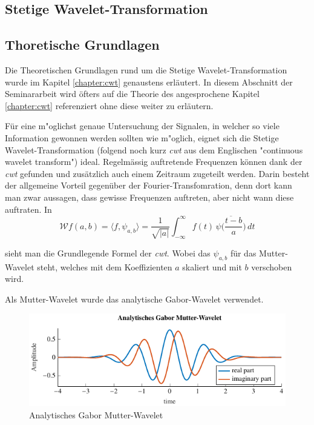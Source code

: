 \begin{refsection}
\newpage
\section{Stetige Wavelet-Transformation}
\subsection{Thoretische Grundlagen}
Die Theoretischen Grundlagen rund um die Stetige Wavelet-Transformation wurde im Kapitel \ref{chapter:cwt} genaustens erläutert. 
In diesem Abschnitt der Seminararbeit wird öfters auf die Theorie des angesprochene Kapitel \ref{chapter:cwt} referenziert ohne diese weiter zu erläutern. 

Für eine m"oglichst genaue Untersuchung der Signalen, in welcher so viele Information gewonnen werden sollten wie m"oglich, eignet sich die Stetige Wavelet-Transformation (folgend noch kurz \textit{cwt} aus dem Englischen "continuous wavelet transform")
ideal. 
Regelmässig auftretende Frequenzen können dank der \textit{cwt} gefunden und zusätzlich auch einem Zeitraum zugeteilt werden.
Darin besteht der allgemeine Vorteil gegenüber der Fourier-Transfomration, denn dort kann man zwar aussagen, dass gewisse Frequenzen auftreten, aber nicht wann diese auftraten.
In 
\begin{equation}
\mathcal{W}f (a,b)
=
\langle f,\psi_{a,b}\rangle
=
\frac{1}{\sqrt{|a|}}\int_{-\infty}^\infty f(t)\,\overline{
	\psi\biggl(\frac{t-b}{a}\biggr)}\,dt
\label{eq:cwt}
\end{equation}

sieht man die Grundlegende Formel der \textit{cwt}.
Wobei das $\psi_{a,b}$ für das Mutter-Wavelet steht, welches mit dem Koeffizienten $a$ skaliert und mit $b$ verschoben wird.

Als Mutter-Wavelet wurde das analytische Gabor-Wavelet verwendet.
\begin{figure}[h]
\centering
\includegraphics[width=1\textwidth]{papers/wwt/images/gabor.pdf}
\caption{Analytisches Gabor Mutter-Wavelet}
\label{fig:gabor_plot}
\end{figure}


\end{refsection}
